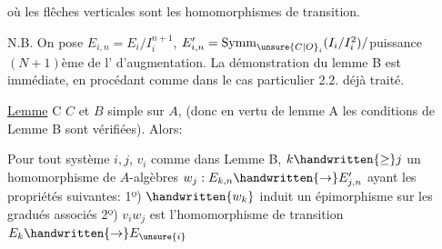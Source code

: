 où les flêches verticales sont les homomorphismes de transition.

N.B. On pose $E_{i,n}=E_i/I_i^{n+1}$, $E'_{i,n}=\operatorname{Symm}_{\unsure{C|O}_i}(I_i/I_i^2)/$puissance $(N+1)$ème de l' d'augmentation. La démonstration du lemme B est immédiate, en procédant comme dans le cas particulier 2.2. déjà traité.

\uline{Lemme} C  $C$ et $B$  simple sur $A$, (donc en vertu de lemme A les conditions de Lemme B sont vérifiées). Alors:

 Pour tout  système $i,j$, $v_i$ comme dans Lemme B,  $k\handwritten{\geq}j$  un homomorphisme de $A$-algèbres $w_j:E_{k,n}\handwritten{\to}E'_{j,n}$ ayant les propriétés suivantes: 1º) $\handwritten{w_k}$ induit un épimorphisme sur les gradués associés \quad 2º) $v_iw_j$ est l'homomorphisme de transition $E_k\handwritten{\to}E_{\unsure{i}}$

